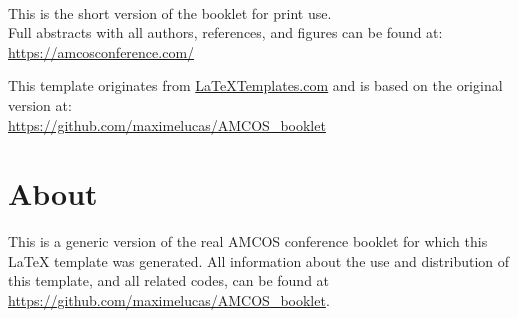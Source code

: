 \documentclass[
openany, %
parskip=full, %
12pt, %
a4paper, %
]{conferencebooklet} %
\begin{document}
	
	
	
	
	\thispagestyle{empty} %
	
	~\vfill %
	
	\begin{center}	
		This is the short version of the booklet for print use. \\ Full abstracts with all authors, references, and figures can be found at:\\ \url{https://amcosconference.com/}
		
		This template originates from \url{LaTeXTemplates.com} and is based on the original version at:\\ \url{https://github.com/maximelucas/AMCOS\_booklet}
	\end{center}
	
	\newpage
	
	
	\tableofcontents
	
	
	\chapter{About}
	
	{\small \textcolor{myblue}{This is a generic version of the real AMCOS conference booklet for which this \LaTeX{} template was generated. All information about the use and distribution of this template, and all related codes, can be found at \url{https://github.com/maximelucas/AMCOS\_booklet}.}}
	
\end{document}
